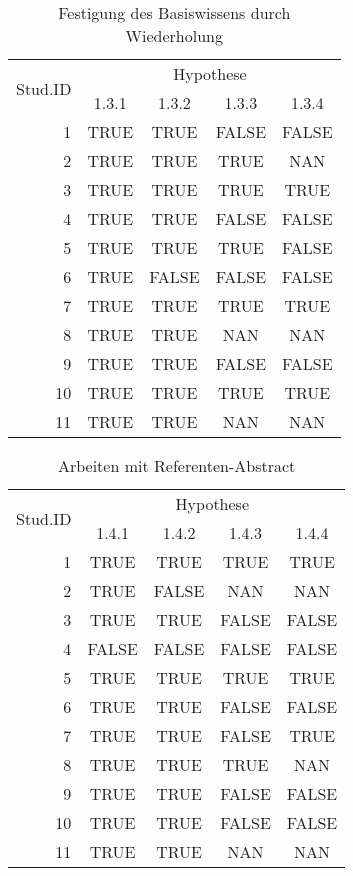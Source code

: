 \begin{table}[h!]
\caption{Festigung des Basiswissens durch Wiederholung}
\label{tab:3}
\begin{center}
\begin{tabular}{|r|c|c|c|c|}
\hline
\multirow{2}{2cm}{Stud.ID} & \multicolumn{4}{|c|}{Hypothese}\\
 & 1.3.1 & 1.3.2 & 1.3.3 & 1.3.4\\
\hline
1 & TRUE & TRUE & FALSE & FALSE\\
2 & TRUE & TRUE & TRUE & NAN\\
3 & TRUE & TRUE & TRUE & TRUE\\
4 & TRUE & TRUE & FALSE & FALSE\\
5 & TRUE & TRUE & TRUE & FALSE\\
6 & TRUE & FALSE & FALSE & FALSE\\
7 & TRUE & TRUE & TRUE & TRUE\\
8 & TRUE & TRUE & NAN & NAN\\
9 & TRUE & TRUE & FALSE & FALSE\\
10 & TRUE & TRUE & TRUE & TRUE\\
11 & TRUE & TRUE & NAN & NAN\\
\hline
\end{tabular}
\end{center}
\end{table}

\begin{table}[h!]
\caption{Arbeiten mit Referenten-Abstract}
\label{tab:4}
\begin{center}
\begin{tabular}{|r|c|c|c|c|}
\hline
\multirow{2}{2cm}{Stud.ID} & \multicolumn{4}{|c|}{Hypothese}\\
 & 1.4.1 & 1.4.2 & 1.4.3 & 1.4.4\\
\hline
1 & TRUE & TRUE & TRUE & TRUE\\
2 & TRUE & FALSE & NAN & NAN\\
3 & TRUE & TRUE & FALSE & FALSE\\
4 & FALSE & FALSE & FALSE & FALSE\\
5 & TRUE & TRUE & TRUE & TRUE\\
6 & TRUE & TRUE & FALSE & FALSE\\
7 & TRUE & TRUE & FALSE & TRUE\\
8 & TRUE & TRUE & TRUE & NAN\\
9 & TRUE & TRUE & FALSE & FALSE\\
10 & TRUE & TRUE & FALSE & FALSE\\
11 & TRUE & TRUE & NAN & NAN\\
\hline
\end{tabular}
\end{center}
\end{table}

